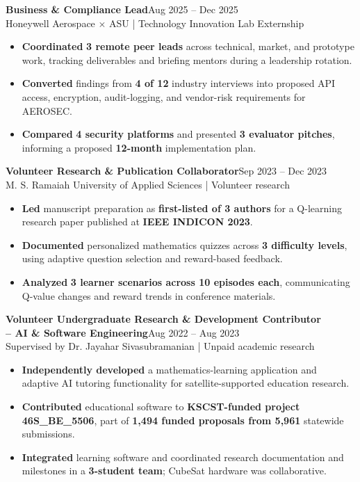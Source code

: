 \documentclass[letterpaper,10pt]{article}
\newcommand{\job}[3]{\noindent\textbf{#1}\hfill{\fontsize{10}{12}\selectfont #2}\\{\fontsize{10}{12}\selectfont #3}\vspace{1.5pt}}
\begin{document}
\job{Business \& Compliance Lead}{Aug 2025 -- Dec 2025}{Honeywell Aerospace $\times$ ASU | Technology Innovation Lab Externship}
\begin{itemize}
\item \textbf{Coordinated} \textbf{3 remote peer leads} across technical, market, and prototype work, tracking deliverables and briefing mentors during a leadership rotation.
\item \textbf{Converted} findings from \textbf{4 of 12} industry interviews into proposed API access, encryption, audit-logging, and vendor-risk requirements for AEROSEC.
\item \textbf{Compared} \textbf{4 security platforms} and presented \textbf{3 evaluator pitches}, informing a proposed \textbf{12-month} implementation plan.
\end{itemize}

\job{Volunteer Research \& Publication Collaborator}{Sep 2023 -- Dec 2023}{M. S. Ramaiah University of Applied Sciences | Volunteer research}
\begin{itemize}
\item \textbf{Led} manuscript preparation as \textbf{first-listed of 3 authors} for a Q-learning research paper published at \textbf{IEEE INDICON 2023}.
\item \textbf{Documented} personalized mathematics quizzes across \textbf{3 difficulty levels}, using adaptive question selection and reward-based feedback.
\item \textbf{Analyzed} \textbf{3 learner scenarios across 10 episodes each}, communicating Q-value changes and reward trends in conference materials.
\end{itemize}

\noindent\textbf{Volunteer Undergraduate Research \& Development Contributor}\\
\noindent\textbf{-- AI \& Software Engineering}\hfill{\fontsize{10}{12}\selectfont Aug 2022 -- Aug 2023}\\
{\fontsize{10}{12}\selectfont Supervised by Dr. Jayahar Sivasubramanian | Unpaid academic research}\vspace{1.5pt}
\begin{itemize}
\item \textbf{Independently developed} a mathematics-learning application and adaptive AI tutoring functionality for satellite-supported education research.
\item \textbf{Contributed} educational software to \textbf{KSCST-funded project 46S\_BE\_5506}, part of \textbf{1,494 funded proposals from 5,961} statewide submissions.
\item \textbf{Integrated} learning software and coordinated research documentation and milestones in a \textbf{3-student team}; CubeSat hardware was collaborative.
\end{itemize}
\end{document}
